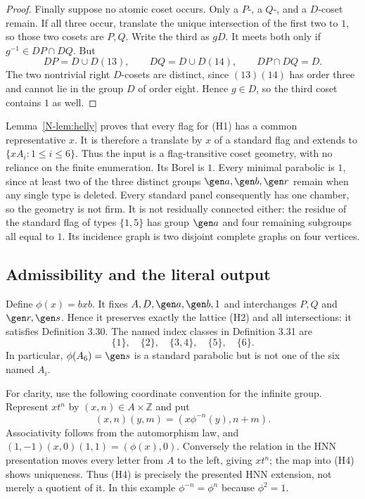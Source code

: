 \begin{proof}
Finally suppose no atomic coset occurs. Only a $P$-, a $Q$-, and a
$D$-coset remain. If all three occur, translate the unique intersection
of the first two to $1$, so those two cosets are $P,Q$. Write the third
as $gD$. It meets both only if $g^{-1}\in DP\cap DQ$. But
\[
 DP=D\cup D(13),\qquad DQ=D\cup D(14),\qquad DP\cap DQ=D.
\]
The two nontrivial right $D$-cosets are distinct, since $(13)(14)$ has
order three and cannot lie in the group $D$ of order eight. Hence
$g\in D$, so the third coset contains $1$ as well.
\end{proof}

Lemma~\ref{N-lem:helly} proves that every flag for (H1) has a common
representative $x$. It is therefore a translate by $x$ of a standard
flag and extends to $\{xA_i:1\leq i\leq6\}$. Thus the input is a
flag-transitive coset geometry, with no reliance on the finite enumeration.
Its Borel is $1$. Every minimal parabolic is $1$, since at least two of
the three distinct groups $\gen a,\gen b,\gen r$ remain when any single
type is deleted. Every standard panel consequently has one chamber,
so the geometry is not firm. It is not residually connected either:
the residue of the standard flag of types $\{1,5\}$ has group $\gen a$
and four remaining subgroups all equal to $1$. Its incidence graph is
two disjoint complete graphs on four vertices.

\subsection{Admissibility and the literal output}
Define $\phi(x)=bxb$. It fixes $A,D,\gen a,\gen b,1$ and interchanges
$P,Q$ and $\gen r,\gen s$. Hence it preserves exactly the lattice (H2)
and all intersections: it satisfies Definition 3.30. The named index
classes in Definition 3.31 are
\[
 \{1\},\quad\{2\},\quad\{3,4\},\quad\{5\},\quad\{6\}.    \tag{H3}
\]
In particular, $\phi(A_6)=\gen s$ is a standard parabolic but is not
one of the six named $A_i$.

For clarity, use the following coordinate convention for the infinite
group. Represent $xt^n$ by $(x,n)\in A\times\mathbb Z$ and put
\[
 (x,n)(y,m)=(x\phi^{-n}(y),n+m).                         \tag{H4}
\]
Associativity follows from the automorphism law, and
$(1,-1)(x,0)(1,1)=(\phi(x),0)$. Conversely the relation in the HNN
presentation moves every letter from $A$ to the left, giving $xt^n$;
the map into (H4) shows uniqueness. Thus (H4) is precisely the presented
HNN extension, not merely a quotient of it. In this example
$\phi^{-n}=\phi^n$ because $\phi^2=1$.

